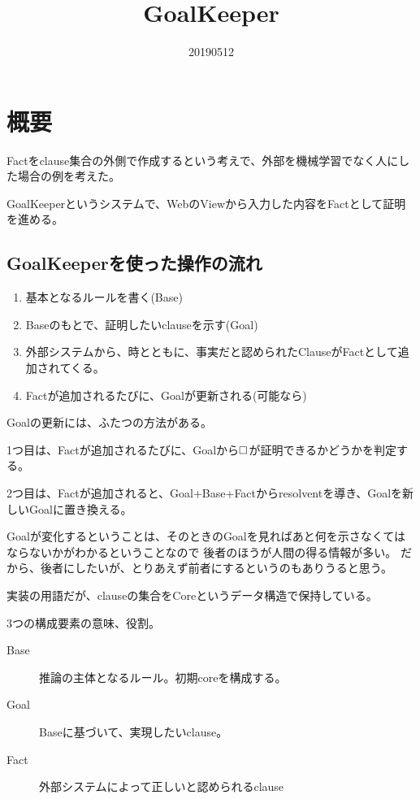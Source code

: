 \documentclass[10pt, onecolumn]{jarticle}   	%
\title{GoalKeeper}
\author{\myname}
\date{20190512}							%
\begin{document}
\maketitle

\section{概要}
Factをclause集合の外側で作成するという考えで、外部を機械学習でなく人にした場合の例を考えた。

GoalKeeperというシステムで、WebのViewから入力した内容をFactとして証明を進める。

\subsection{GoalKeeperを使った操作の流れ}

\begin{enumerate}
\item 基本となるルールを書く(Base)
\item Baseのもとで、証明したいclauseを示す(Goal)
\item 外部システムから、時とともに、事実だと認められたClauseがFactとして追加されてくる。
\item Factが追加されるたびに、Goalが更新される(可能なら)
\end{enumerate}


Goalの更新には、ふたつの方法がある。

1つ目は、Factが追加されるたびに、Goalから$\Box$が証明できるかどうかを判定する。

2つ目は、Factが追加されると、Goal+Base+Factからresolventを導き、Goalを新しいGoalに置き換える。

Goalが変化するということは、そのときのGoalを見ればあと何を示さなくてはならないかがわかるということなので
後者のほうが人間の得る情報が多い。
だから、後者にしたいが、とりあえず前者にするというのもありうると思う。

実装の用語だが、clauseの集合をCoreというデータ構造で保持している。

3つの構成要素の意味、役割。

\begin{description}
\item[ Base] 推論の主体となるルール。初期coreを構成する。
\item[ Goal] Baseに基づいて、実現したいclause。
\item[ Fact] 外部システムによって正しいと認められるclause
\end{description}
\end{document}
